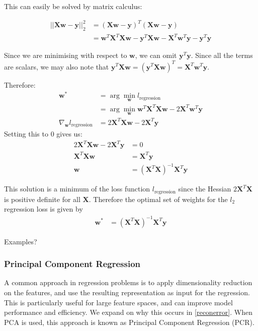 This can easily be solved by matrix calculus:
 
 \begin{align*}
     ||\mathbf{X}\mathbf{w} - \mathbf{y}||_2^2  &= (\mathbf{X}\mathbf{w} - \mathbf{y})^T(\mathbf{X}\mathbf{w} - \mathbf{y}) \\
     &= \mathbf{w}^T\mathbf{X}^T \mathbf{X}\mathbf{w} - \mathbf{y}^T\mathbf{X}\mathbf{w} - \mathbf{X}^T\mathbf{w}^T\mathbf{y} - \mathbf{y}^T\mathbf{y}
 \end{align*}
 
 Since we are minimising with respect to $\mathbf{w}$, we can omit $\mathbf{y}^T\mathbf{y}$. Since all the terms are scalars, we may also note that $\mathbf{y}^T\mathbf{X}\mathbf{w} = (\mathbf{y}^T\mathbf{X}\mathbf{w})^T = 
 \mathbf{X}^T\mathbf{w}^T\mathbf{y} $. 
 
 Therefore: 
\begin{align*}
    \mathbf{w}^* &= \arg \min_{\mathbf{w}}l_{\mathrm{regression}} \\ 
    &= \arg \min_{\mathbf{w}} \mathbf{w}^T\mathbf{X}^T \mathbf{X}\mathbf{w}  - 2\mathbf{X}^T\mathbf{w}^T\mathbf{y} \\
    \nabla_{\mathbf{w}} l_{\mathrm{regression}} &= 2
\mathbf{X}^T \mathbf{X}\mathbf{w} - 2\mathbf{X}^T\mathbf{y}
\end{align*}
Setting this to $0$ gives us:
\begin{align*}
2
\mathbf{X}^T \mathbf{X}\mathbf{w} - 2\mathbf{X}^T\mathbf{y} &= 0 \\
\mathbf{X}^T \mathbf{X}\mathbf{w} &= \mathbf{X}^T\mathbf{y} \\
\mathbf{w} &= (\mathbf{X}^T \mathbf{X})^{-1}\mathbf{X}^T\mathbf{y}
\end{align*}

This solution is a minimum of the loss function $l_{\mathrm{regression}}$ since the Hessian $2\mathbf{X}^T\mathbf{X}$ is positive definite for all $\mathbf{X}$. Therefore the optimal set of weights for the $l_2$ regression loss is given by 
\begin{align}
    \mathbf{w}^* &= (\mathbf{X}^T \mathbf{X})^{-1}\mathbf{X}^T\mathbf{y}
\end{align}

Examples?



\subsubsection{Principal Component Regression}
A common approach in regression problems is to apply dimensionality reduction on the features, and use the resulting representation as input for the regression. This is particularly useful for large feature spaces, and can improve model performance and efficiency. We expand on why this occurs in \ref{reconerror}. When PCA is used, this approach is known as Principal Component Regression (PCR). 


